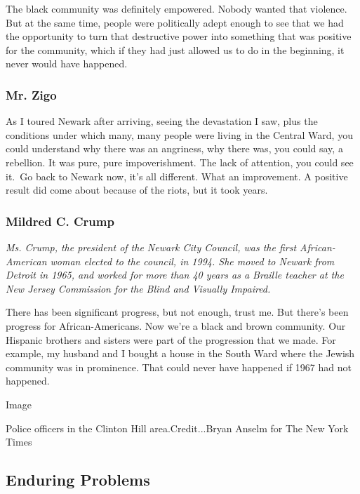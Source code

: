 The black community was definitely empowered. Nobody wanted that
violence. But at the same time, people were politically adept enough to
see that we had the opportunity to turn that destructive power into
something that was positive for the community, which if they had just
allowed us to do in the beginning, it never would have happened.

\hypertarget{mr-zigo}{%
\subsubsection{Mr. Zigo}\label{mr-zigo}}

As I toured Newark after arriving, seeing the devastation I saw, plus
the conditions under which many, many people were living in the Central
Ward, you could understand why there was an angriness, why there was,
you could say, a rebellion. It was pure, pure impoverishment. The lack
of attention, you could see it.~Go back to Newark now, it's all
different. What an improvement. A positive result did come about because
of the riots, but it took years.

\hypertarget{mildred-c-crump}{%
\subsubsection{Mildred C. Crump}\label{mildred-c-crump}}

\emph{Ms. Crump, the president of the Newark City Council, was the first
African-American woman elected to the council, in 1994. She moved to
Newark from Detroit in 1965, and worked for more than 40 years as a
Braille teacher at the New Jersey Commission for the Blind and Visually
Impaired.}

There has been significant progress, but not enough, trust me. But
there's been progress for African-Americans. Now we're a black and brown
community. Our Hispanic brothers and sisters were part of the
progression that we made. For example, my husband and I bought a house
in the South Ward where the Jewish community was in prominence. That
could never have happened if 1967 had not happened.

Image

Police officers in the Clinton Hill area.Credit...Bryan Anselm for The
New York Times

\hypertarget{enduring-problems}{%
\subsection{Enduring Problems}\label{enduring-problems}}

